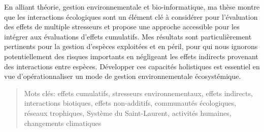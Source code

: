 En alliant théorie, gestion environnementale et bio-informatique, ma
thèse montre que les interactions écologiques sont un élément clé à
considérer pour l'évaluation des effets de multiple stresseurs et
propose une approche accessible pour les intégrer aux évaluations
d'effets cumulatifs. Mes résultats sont particulièrement pertinents pour
la gestion d'espèces exploitées et en péril, pour qui nous ignorons
potentiellement des risques importants en négligeant les effets
indirects provenant des interactions entre espèces. Développer ces
capacités holistiques est essentiel en vue d'opérationnaliser un mode de
gestion environnementale écosystémique.

\begin{quote}
Mots clés: effets cumulatifs, stresseurs environnementaux, effets
indirects, interactions biotiques, effets non-additifs, communautés
écologiques, réseaux trophiques, Système du Saint-Laurent, activités
humaines, changements climatiques
\end{quote}
